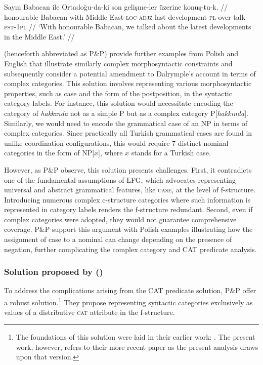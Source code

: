 \pex[glspace=!1em,everygla={},everyglb={},aboveglbskip=-.15ex, interpartskip=15pt]
\label{PPNP-konus2} 
\begingl
\gla Sayın Babacan ile Ortadoğu-da-ki son gelişme-ler üzerine konuş-tu-k. //
\glb honourable Babacan with {Middle East}-\textsc{loc}-\textsc{adjz} last development-\textsc{pl} over talk-\textsc{pst}-\textsc{1pl} //
\glft `With honourable Babacan, we talked about the latest developments in the Middle East.' //
\endgl
\xe

\citet{prz:pat:21:oup} (henceforth abbreviated as P\&P) provide further examples from Polish and English that illustrate similarly complex morphosyntactic constraints and subsequently consider a potential amendment to Dalrymple's account in terms of complex categories. This solution involves representing various morphosyntactic properties, such as case and the form of the postposition, in the syntactic category labels. For instance, this solution would necessitate encoding the category of \textit{hakkında} not as a simple P but as a complex category P[\textit{hakkında}]. Similarly, we would need to encode the grammatical case of an NP in terms of complex categories. Since practically all Turkish grammatical cases are found in unlike coordination configurations, this would require 7 distinct nominal categories in the form of NP[$x$], where $x$ stands for a Turkish case.

However, as P\&P observe, this solution presents challenges. First, it contradicts one of the fundamental assumptions of LFG, which advocates representing universal and abstract grammatical features, like \textsc{case}, at the level of f-structure. Introducing numerous complex c-structure categories where such information is represented in category labels renders the f-structure redundant. Second, even if complex categories were adopted, they would not guarantee comprehensive coverage. P\&P support this argument with Polish examples illustrating how the assignment of case to a nominal can change depending on the presence of negation, further complicating the complex category and CAT predicate analysis.


\subsubsection{Solution proposed by \citeauthor{prz:pat:21:oup} (\citeyear{pat:prz:12b,prz:pat:21:oup})}

To address the complications arising from the CAT predicate solution, P\&P offer a robust solution.\footnote{The foundations of this solution were laid in their earlier work: \citet{prz:pat:12a}. The present work, however, refers to their more recent paper as the present analysis draws upon that version.} They propose representing syntactic categories exclusively as values of a distributive \textsc{cat} attribute in the f-structure.
  

